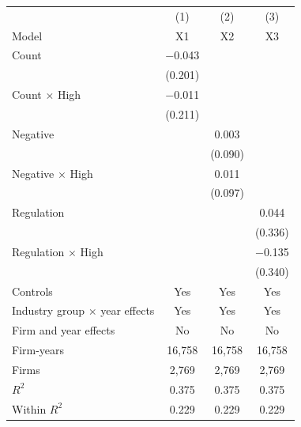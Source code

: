 \begin{tabular}{lccc}
\toprule
 & (1) & (2) & (3) \\
Model & X1 & X2 & X3 \\
\midrule
Count & $-$0.043 &  &  \\
 & (0.201) &  &  \\
Count $\times$ High & $-$0.011 &  &  \\
 & (0.211) &  &  \\
Negative &  & 0.003 &  \\
 &  & (0.090) &  \\
Negative $\times$ High &  & 0.011 &  \\
 &  & (0.097) &  \\
Regulation &  &  & 0.044 \\
 &  &  & (0.336) \\
Regulation $\times$ High &  &  & $-$0.135 \\
 &  &  & (0.340) \\
\midrule
Controls & Yes & Yes & Yes \\
Industry group $\times$ year effects & Yes & Yes & Yes \\
Firm and year effects & No & No & No \\
Firm-years & 16,758 & 16,758 & 16,758 \\
Firms & 2,769 & 2,769 & 2,769 \\
$R^2$ & 0.375 & 0.375 & 0.375 \\
Within $R^2$ & 0.229 & 0.229 & 0.229 \\
\bottomrule
\end{tabular}
